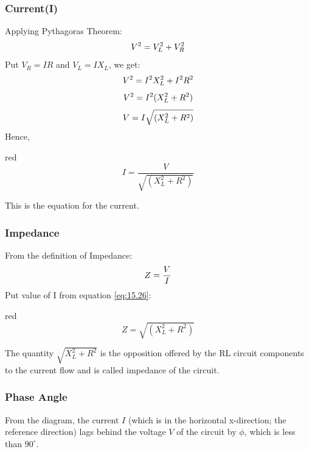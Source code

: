 \subsubsection{Current(I)}
Applying Pythagoras Theorem:
\begin{equation}\notag
    V^{2}=V_{L}^{2} + V_{R}^{2}
\end{equation}
Put $V_{R}=IR$ and $V_{L}=IX_{L}$, we get:
\begin{equation}\notag
    V^{2}=I^{2}X_{L}^{2} + I^{2}R^{2}
\end{equation}
\begin{equation}\notag
    V^{2}=I^{2} (X_{L}^{2} + R^{2})
\end{equation}
\begin{equation}\notag
    V=I \sqrt{ (X_{L}^{2} + R^{2})}
\end{equation}
Hence,
\begin{mybox}{red}{}
\begin{equation}\label{eq:15.26}
    I=\frac{V}{\sqrt{ (X_{L}^{2} + R^{2})}}
\end{equation}
\end{mybox}
\noindent This is the equation for the current.
\subsubsection{Impedance}
From the definition of Impedance:
\begin{equation}\notag
    Z = \frac{V}{I}
\end{equation}
Put value of I from equation \ref{eq:15.26}:
\begin{mybox}{red}{}
\begin{equation}
    Z = \sqrt{ (X_{L}^{2} + R^{2})}
\end{equation}
\end{mybox}
The quantity $\sqrt{X_{L}^{2} + R^{2}}$ is the opposition offered
by the RL circuit components to the current flow and is called
impedance of the circuit.
\subsubsection{Phase Angle}
From the diagram, the current $I$ (which is in the horizontal x-direction;
the reference direction) lags behind the voltage $V$ of the circuit
by $\phi$, which is less than $90^{\circ}$.

